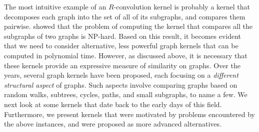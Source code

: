 \documentclass[twoside,11pt]{article}
\begin{document}
The most intuitive example of an $R$-convolution kernel is probably a kernel that decomposes each graph into the set of all of its subgraphs, and compares them pairwise.
 showed that the problem of computing the kernel that compares all the subgraphs of two graphs is NP-hard.
Based on this result, it becomes evident that we need to consider alternative, less powerful graph kernels that can be computed in polynomial time.
However, as discussed above, it is necessary that these kernels provide an expressive measure of similarity on graphs.
Over the years,  several graph kernels have been proposed, each focusing on a \textit{different structural aspect} of graphs.
Such aspects involve comparing graphs based on random walks, subtrees, cycles, paths, and small subgraphs, to name a few.
We next look at some kernels that date back to the early days of this field.
Furthermore, we present kernels that were motivated by problems encountered by the above instances, and were proposed as more advanced alternatives. 
\end{document}
